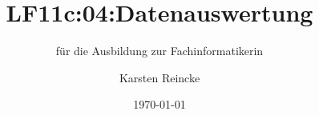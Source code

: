 \documentclass[]{beamer}
\title{LF11c:04:Datenauswertung}
\subtitle{für die Ausbildung zur Fachinformatikerin}
\institute[GS-LDK]{Gewerbliche Schulen Dillenburg}
\author{Karsten Reincke}
\date{\today}
\def\cfgGl{../../../cfg.gl/}
\begin{document}

\begin{frame}
  \titlepage

  
\end{frame}






\logo{}
\newpage



%
\end{document}
